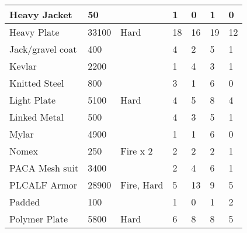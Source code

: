 \documentclass[twoside]{book}
\begin{document}
\begin{longtable}{p{1.25in}llp{2em}p{2em}p{2em}p{2em}}
  \raggedright
           Heavy Jacket 
  &
   50 
  &
  
  &
   1 
  &
   0 
  &
   1 
  &
   0 
  \tabularnewline
  \hline
      
  \raggedright
           Heavy Plate 
  &
   33100 
  &
   Hard 
  &
   18 
  &
   16 
  &
   19 
  &
   12 
  \tabularnewline
  \hline
      
  \raggedright
           Jack/gravel coat 
  &
   400 
  &
  
  &
   4 
  &
   2 
  &
   5 
  &
   1 
  \tabularnewline
  \hline
      
  \raggedright
           Kevlar 
  &
   2200 
  &
  
  &
   1 
  &
   4 
  &
   3 
  &
   1 
  \tabularnewline
  \hline
      
  \raggedright
           Knitted Steel 
  &
   800 
  &
  
  &
   3 
  &
   1 
  &
   6 
  &
   0 
  \tabularnewline
  \hline
      
  \raggedright
           Light Plate 
  &
   5100 
  &
   Hard 
  &
   4 
  &
   5 
  &
   8 
  &
   4 
  \tabularnewline
  \hline
      
  \raggedright
           Linked Metal 
  &
   500 
  &
  
  &
   4 
  &
   3 
  &
   5 
  &
   1 
  \tabularnewline
  \hline
      
  \raggedright
           Mylar 
  &
   4900 
  &
  
  &
   1 
  &
   1 
  &
   6 
  &
   0 
  \tabularnewline
  \hline
      
  \raggedright
           Nomex 
  &
   250 
  &
   Fire x 2 
  &
   2 
  &
   2 
  &
   2 
  &
   1 
  \tabularnewline
  \hline
      
  \raggedright
           PACA Mesh suit 
  &
   3400 
  &
  
  &
   2 
  &
   4 
  &
   6 
  &
   1 
  \tabularnewline
  \hline
      
  \raggedright
           PLCALF Armor 
  &
   28900 
  &
   Fire, Hard 
  &
   5 
  &
   13 
  &
   9 
  &
   5 
  \tabularnewline
  \hline
      
  \raggedright
           Padded 
  &
   100 
  &
  
  &
   1 
  &
   0 
  &
   1 
  &
   2 
  \tabularnewline
  \hline
      
  \raggedright
           Polymer Plate 
  &
   5800 
  &
   Hard 
  &
   6 
  &
   8 
  &
   8 
  &
   5 
  \tabularnewline
  \hline
      

\end{longtable}
\end{document}
